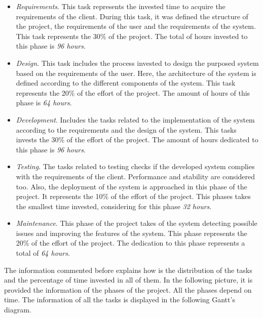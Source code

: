 \begin{itemize}

\item \textit{Requirements}. This task represents the invested time to acquire the requirements of the client. During this task, it was defined the structure of the project, the requirements of the user and the requirements of the system. This task represents the 30\% of the project. The total of hours invested to this phase is \textit{96 hours}.
\item \textit{Design}. This task includes the process invested to design the purposed system based on the requirements of the user. Here, the architecture of the system is defined according to the different components of the system. This task represents the 20\% of the effort of the project. The amount of hours of this phase is \textit{64 hours}.
\item \textit{Development}. Includes the tasks related to the implementation of the system according to the requirements and the design of the system. This tasks invests the 30\% of the effort of the project. The amount of hours dedicated to this phase is \textit{96 hours}.
\item \textit{Testing}. The tasks related to testing checks if the developed system complies with the requirements of the client. Performance and stability are considered too. Also, the deployment of the system is approached in this phase of the project. It represents the 10\% of the effort of the project. This phases takes the smallest time invested, considering for this phase \textit{32 hours}.
\item \textit{Maintenance}. This phase of the project takes of the system detecting possible issues and improving the features of the system. This phase represents the 20\% of the effort of the project. The dedication to this phase represents a total of \textit{64 hours}.

\end{itemize}

The information commented before explains how is the distribution of the tasks and the percentage of time invested in all of them. In the following picture, it is provided the information of the phases of the project. All the phases depend on time. The information of all the tasks is displayed in the following Gantt's diagram.\\

